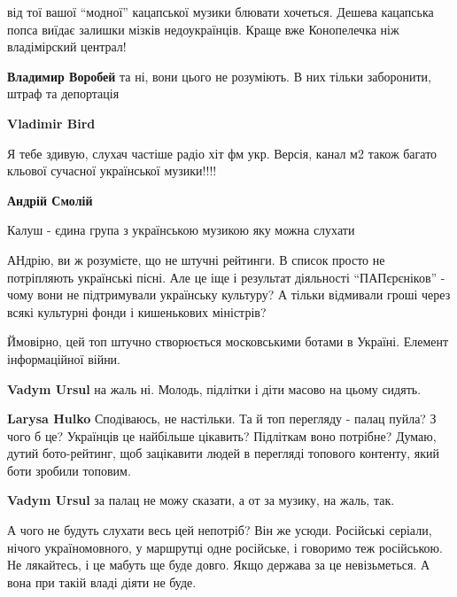 \begin{itemize}
\begin{itemize}
від тої вашої \enquote{модної} кацапської музики блювати хочеться. Дешева кацапська
попса виїдає залишки мізків недоукраїнців. Краще вже Конопелечка ніж
владімірский централ!


\textbf{Владимир Воробей} та ні, вони цього не розуміють. В них тільки заборонити, штраф та депортація

\textbf{Vladimir Bird} 

Я тебе здивую, слухач частіше радіо хіт фм укр. Версія, канал м2 також багато
кльової сучасної української музики!!!!

\textbf{Андрій Смолій} 

Калуш - єдина група з українською музикою яку можна слухати

\end{itemize} %


АНдрію, ви ж розумієте, що не штучні рейтинги. В список просто не потріпляють
українські пісні. Але це іще і результат діяльності \enquote{ПАПєрєніков} - чому вони
не підтримували українську культуру? А тільки відмивали гроші через всякі
культурні фонди і кишенькових міністрів?


Ймовірно, цей топ штучно створюється московськими ботами в Україні. Елемент
інформаційної війни.

\begin{itemize} %
\textbf{Vadym Ursul} на жаль ні. Молодь, підлітки і діти масово на цьому сидять.

\textbf{Larysa Hulko} Сподіваюсь, не настільки. Та й топ перегляду - палац пуйла? З чого б це? Українців це найбільше цікавить? Підліткам воно потрібне? Думаю, дутий бото-рейтинг, щоб зацікавити людей в перегляді топового контенту, який боти зробили топовим.

\textbf{Vadym Ursul} за палац не можу сказати, а от за музику, на жаль, так.
\end{itemize} %


А чого не будуть слухати весь цей непотріб? Він же усюди. Російські серіали,
нічого україномовного, у маршрутці одне російське, і говоримо теж російською.
Не лякайтесь, і це мабуть ще буде довго. Якщо держава за це невізьметься. А
вона при такій владі діяти не буде.



\end{itemize}
